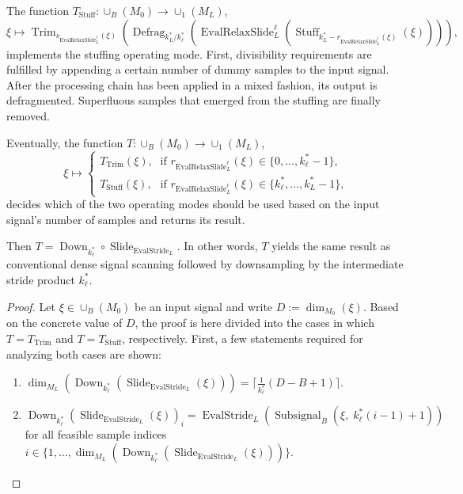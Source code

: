 \documentclass[journal]{IEEEtran}
\newcommand{\ROI}{B}
\newcommand{\discint}[2]{\{#1,\dotsc,#2\}}
\newcommand{\inint}[2]{\in\discint{#1}{#2}}
\newcommand{\nceil}[1]{\lceil #1 \rceil}
\DeclareMathOperator{\Subsignal}{Subsignal}
\DeclareMathOperator{\Slide}{Slide}
\DeclareMathOperator{\Defragmentation}{Defrag}
\DeclareMathOperator{\EvalStride}{EvalStride}
\DeclareMathOperator{\Stuffing}{Stuff}
\DeclareMathOperator{\Trimming}{Trim}
\DeclareMathOperator{\EvalRelaxSlide}{EvalRelaxSlide}
\DeclareMathOperator{\Downsampling}{Down}
\begin{document}
\begin{theorem}
The function $T_{\Stuffing}\colon\cup_\ROI(M_0)\to\cup_1(M_L)$,
\begin{displaymath}
  \xi\mapsto \Trimming_{s_{\EvalRelaxSlide_L^\ell}(\xi)}( \Defragmentation_{k_L^* / k_\ell^*}( \EvalRelaxSlide_L^\ell( \Stuffing_{k_L^* - r_{\EvalRelaxSlide_L^\ell}(\xi)}(\xi) ) ) )\text{,}
\end{displaymath}
implements the stuffing operating mode.
First, divisibility requirements are fulfilled by appending a certain number of dummy samples to the input signal.
After the processing chain has been applied in a mixed fashion, its output is defragmented.
Superfluous samples that emerged from the stuffing are finally removed.

Eventually, the function $T\colon\cup_\ROI(M_0)\to\cup_1(M_L)$,
\begin{displaymath}
  \xi\mapsto
  \begin{cases}
    T_{\Trimming}(\xi)\text{,} & \text{if } r_{\EvalRelaxSlide_L^\ell}(\xi)\inint{0}{k_\ell^* - 1}\text{,}\\
    T_{\Stuffing}(\xi)\text{,} & \text{if } r_{\EvalRelaxSlide_L^\ell}(\xi)\inint{k_\ell^*}{k_L^* - 1}\text{,}
  \end{cases}
\end{displaymath}
decides which of the two operating modes should be used based on the input signal's number of samples and returns its result.

Then $T = \Downsampling_{k_\ell^*}\circ \Slide_{\EvalStride_L}$.
In other words, $T$ yields the same result as conventional dense signal scanning followed by downsampling by the intermediate stride product $k_\ell^*$.
\end{theorem}\begin{proof}
Let $\xi\in\cup_\ROI(M_0)$ be an input signal and write $D := \dim_{M_0}(\xi)$.
Based on the concrete value of $D$, the proof is here divided into the cases in which $T = T_{\Trimming}$ and $T = T_{\Stuffing}$, respectively.
First, a few statements required for analyzing both cases are shown:
\begin{enumerate}\setlength{\baselineskip}{1.1\baselineskip}
  \item \label{thm:evalrelaxslide-preq-a} $\dim_{M_L}( \Downsampling_{k_\ell^*}( \Slide_{\EvalStride_L}(\xi) ) ) = \nceil{\frac{1}{k_\ell^*}( D - \ROI + 1 )}$.
  \item \label{thm:evalrelaxslide-preq-b} $\Downsampling_{k_\ell^*}( \Slide_{\EvalStride_L}(\xi) )_i = \EvalStride_L(\Subsignal_\ROI(\xi,\; k_\ell^*(i - 1) + 1))$ for all feasible sample indices $i\inint{1}{\dim_{M_L}( \Downsampling_{k_\ell^*}( \Slide_{\EvalStride_L}(\xi) ) )}$.
\end{enumerate}


\end{proof}
\end{document}
